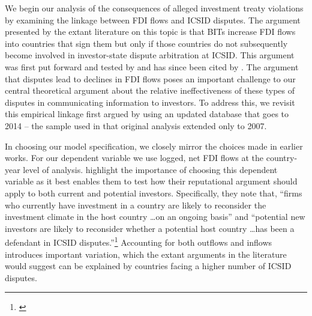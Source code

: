 \documentclass[12pt,onesided]{amsart}
\begin{document}
We begin our analysis of the consequences of alleged investment treaty violations by examining the linkage between FDI flows and ICSID disputes. The argument presented by the extant literature on this topic is that BITs increase FDI flows into countries that sign them but only if those countries do not subsequently become involved in investor-state dispute arbitration at ICSID. This argument was first put forward and tested by \citet{allee:peinhardt:2011} and has since been cited by \citet{berger2011more,poulsen2013claim,wellhausen2013,haftel2013delayed,kerner2014}. The argument that disputes lead to declines in FDI flows poses an important challenge to our central theoretical argument about the relative ineffectiveness of these types of disputes in communicating information to investors. To address this, we revisit this empirical linkage first argued by \citet{allee:peinhardt:2011} using an updated database that goes to 2014 -- the sample used in that original analysis extended only to 2007.

In choosing our model specification, we closely mirror the choices made in earlier works. For our dependent variable we use logged, net FDI flows at the country-year level of analysis. \citeauthor{allee:peinhardt:2011} highlight the importance of choosing this dependent variable as it best enables them to test how their reputational argument should apply to both current and potential investors. Specifically, they note that, ``firms who currently have investment in a country are likely to reconsider the investment climate in the host country \ldots on an ongoing basis'' and ``potential new investors are likely to reconsider whether a potential host country \ldots has been a defendant in ICSID disputes.''\footnote{\citet[p. 419--420]{allee:peinhardt:2011}} Accounting for both outflows and inflows introduces important variation, which the extant arguments in the literature would suggest can be explained by countries facing a higher number of ICSID disputes. 
\end{document}
